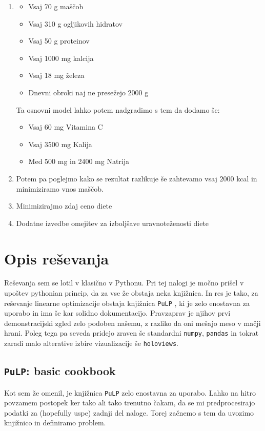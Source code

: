 \documentclass[a4paper]{article}
\begin{document}
\begin{enumerate}
    \item \begin{itemize}
        \item Vsaj 70 g maščob
        \item Vsaj 310 g ogljikovih hidratov
        \item Vsaj 50 g proteinov
        \item Vsaj 1000 mg kalcija
        \item Vsaj 18 mg železa
        \item Dnevni obroki naj ne presežejo 2000 g
    \end{itemize}

    Ta osnovni model lahko potem nadgradimo s tem da dodamo še:
    \begin{itemize}
        \item Vsaj 60 mg Vitamina C
        \item Vsaj 3500 mg Kalija
        \item Med 500 mg in 2400 mg Natrija
    \end{itemize}

    \item Potem pa poglejmo kako se rezultat razlikuje še zahtevamo vsaj $2000$ kcal in minimiziramo
    vnos maščob.

    \item Minimizirajmo zdaj ceno diete
    \item Dodatne izvedbe omejitev za izboljšave uravnoteženosti diete

\end{enumerate}

\section{Opis reševanja}
Reševanja sem se lotil v klasično v Pythonu. Pri tej nalogi je močno prišel v upoštev 
pythonian princip, da za vse že obstaja neka knjižnica. In res je tako, za reševanje linearne 
optimizacije obstaja knjižnica \texttt{PuLP} \cite{Mitchell2011PuLPA}, ki je zelo enostavna za uporabo in ima še kar solidno 
dokumentacijo. Pravzaprav je njihov prvi demonstracijski zgled zelo podoben našemu, z razliko da oni
mešajo meso v mačji hrani. Poleg tega pa seveda pridejo zraven še standardni \texttt{numpy}, \texttt{pandas}
in tokrat zaradi malo alterative izbire vizualizacije še \texttt{holoviews}. \\


\subsection{\texttt{PuLP}: basic cookbook}
Kot sem že omenil, je knjižnica \texttt{PuLP} zelo enostavna za uporabo. Lahko na hitro povzamem postopek
ker tako ali tako trenutno čakam, da se mi predprocesirajo podatki za (hopefully uspe) zadnji del naloge.
Torej začnemo s tem da uvozimo knjižnico in definiramo problem. 
\end{document}
